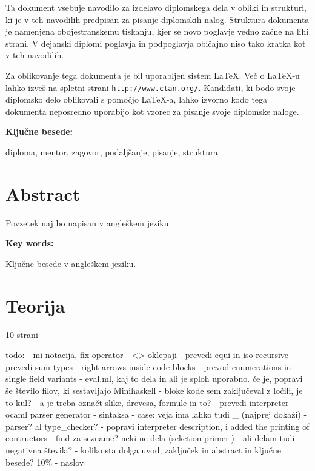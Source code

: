 \documentclass[12pt,a4paper,openany]{book}
\begin{document}
Ta dokument vsebuje navodilo za izdelavo diplomskega dela v obliki in strukturi, ki je v teh navodilih predpisan za
pisanje diplomskih nalog. Struktura dokumenta je namenjena obojestranskemu tiskanju, kjer se novo poglavje vedno za\v cne na lihi strani.
V dejanski diplomi poglavja in podpogla\-vja  obi\v cajno niso tako kratka kot v teh navodilih.

Za oblikovanje tega dokumenta je bil uporabljen sistem \LaTeX.
Ve\v c o \LaTeX-u lahko izve\v s na spletni strani \texttt{http://www.ctan.org/}.
Kandidati, ki bodo svoje diplomsko delo oblikovali s pomo\v cjo
\LaTeX-a, lahko izvorno kodo tega dokumenta neposredno uporabijo kot vzorec za pisanje svoje diplomske naloge.

\vspace{1.3cm}
\noindent
{\large \bf Ključne besede:}

\vspace{0.5cm}
\noindent
diploma, mentor, zagovor, podaljšanje, pisanje, struktura


\chapter*{Abstract}


Povzetek naj bo napisan v angleškem jeziku.

\vspace{1.3cm}
\noindent
{\large \bf Key words:}

\vspace{0.5cm}
\noindent
Ključne besede v angleškem jeziku.



\chapter{Teorija}
10 strani

todo: 
- mi notacija, fix operator
- <> oklepaji
- prevedi equi in iso recursive
- prevedi sum types
- right arrows inside code blocks
- prevod enumerations in single field variants
- eval.ml, kaj to dela in ali je sploh uporabno. če je, popravi še število filov, ki sestavljajo Minihaskell
- bloke kode sem zaključeval z ločili, je to kul?
- a je treba označt slike, drevesa, formule in to?
- prevedi interpreter
- ocaml parser generator
- sintaksa
- case: veja ima lahko tudi _ (najprej dokaži) - parser? al type_checker?
- popravi interpreter description, i added the printing of contructors
- find za sezname? neki ne dela (sekction primeri)
- ali delam tudi negativna števila?
- koliko sta dolga uvod, zaključek in abstract in ključne besede? 10\%
- naslov
\end{document}
